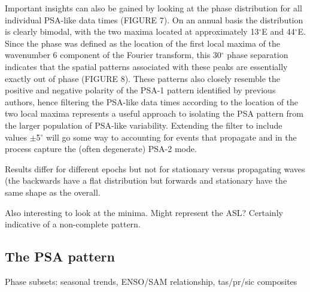 Important insights can also be gained by looking at the phase distribution for all individual PSA-like data times (FIGURE 7). On an annual basis the distribution is clearly bimodal, with the two maxima located at approximately 13$^{\circ}$E and 44$^{\circ}$E. Since the phase was defined as the location of the first local maxima of the wavenumber 6 component of the Fourier transform, this 30$^{\circ}$ phase separation indicates that the spatial patterns associated with these peaks are essentially exactly out of phase (FIGURE 8). These patterns also closely resemble the positive and negative polarity of the PSA-1 pattern identified by previous authors, hence filtering the PSA-like data times according to the location of the two local maxima represents a useful approach to isolating the PSA pattern from the larger population of PSA-like variability. Extending the filter to include values  $\pm$5$^{\circ}$ will go some way to accounting for events that propagate and in the process capture the (often degenerate) PSA-2 mode. 

Results differ for different epochs but not for stationary versus propagating waves (the backwards have a flat distribution but forwards and stationary have the same shape as the overall.

Also interesting to look at the minima. Might represent the ASL? Certainly indicative of a non-complete pattern.

\subsection{The PSA pattern}

Phase subsets: seasonal trends, ENSO/SAM relationship, tas/pr/sic composites







